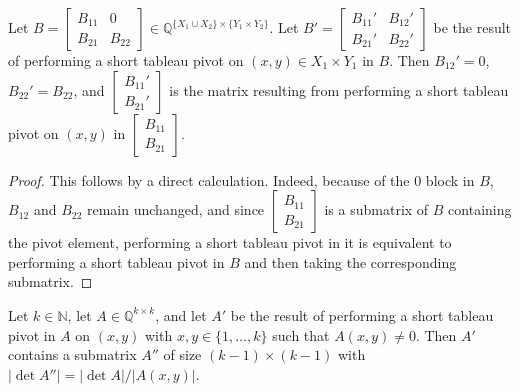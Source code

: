 \begin{lemma}
    \label{Matrix.shortTableauPivot_zero}
    \leanok
    Let $B = \begin{bmatrix} B_{11} & 0 \\ B_{21} & B_{22} \end{bmatrix} \in \mathbb{Q}^{\{X_{1} \cup X_{2}\} \times \{Y_{1} \times Y_{2}\}}$. Let $B' = \begin{bmatrix} B_{11}' & B_{12}' \\ B_{21}' & B_{22}' \end{bmatrix}$ be the result of performing a short tableau pivot on $(x, y) \in X_{1} \times Y_{1}$ in $B$. Then $B_{12}' = 0$, $B_{22}' = B_{22}$, and $\begin{bmatrix} B_{11}' \\ B_{21}' \end{bmatrix}$ is the matrix resulting from performing a short tableau pivot on $(x, y)$ in $\begin{bmatrix} B_{11} \\ B_{21} \end{bmatrix}$.
\end{lemma}

\begin{proof}
    \leanok
    This follows by a direct calculation. Indeed, because of the $0$ block in $B$, $B_{12}$ and $B_{22}$ remain unchanged, and since $\begin{bmatrix} B_{11} \\ B_{21} \end{bmatrix}$ is a submatrix of $B$ containing the pivot element, performing a short tableau pivot in it is equivalent to performing a short tableau pivot in $B$ and then taking the corresponding submatrix.
\end{proof}

\begin{lemma}
    \label{shortTableauPivot_submatrix_det_abs_eq_div}
    \leanok
    Let $k \in \mathbb{N}$, let $A \in \mathbb{Q}^{k \times k}$, and let $A'$ be the result of performing a short tableau pivot in $A$ on $(x, y)$ with $x, y \in \{1, \dots, k\}$ such that $A (x, y) \neq 0$. Then $A'$ contains a submatrix $A''$ of size $(k - 1) \times (k - 1)$ with $|\det A''| = |\det A| / |A (x, y)|$.
\end{lemma}

